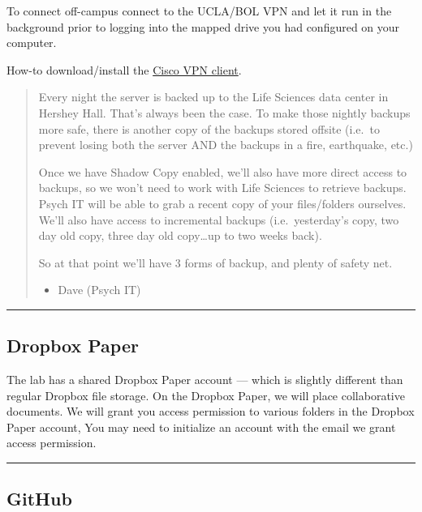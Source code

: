\documentclass[
]{book}
\providecommand{\tightlist}{%
  \setlength{\itemsep}{0pt}\setlength{\parskip}{0pt}}
\begin{document}
To connect off-campus connect to the UCLA/BOL VPN and let it run in the background prior to logging into the mapped drive you had configured on your computer.

How-to download/install the \href{https://help.bol.ucla.edu/kb_view.do?sysparm_article=kb0010923}{Cisco VPN client}.

\begin{quote}
Every night the server is backed up to the Life Sciences data center in Hershey Hall. That's always been the case. To make those nightly backups more safe, there is another copy of the backups stored offsite (i.e.~to prevent losing both the server AND the backups in a fire, earthquake, etc.)

Once we have Shadow Copy enabled, we'll also have more direct access to backups, so we won't need to work with Life Sciences to retrieve backups. Psych IT will be able to grab a recent copy of your files/folders ourselves. We'll also have access to incremental backups (i.e.~yesterday's copy, two day old copy, three day old copy\ldots up to two weeks back).

So at that point we'll have 3 forms of backup, and plenty of safety net.

\begin{itemize}
\tightlist
\item
  Dave (Psych IT)
\end{itemize}
\end{quote}

\begin{center}\rule{0.5\linewidth}{0.5pt}\end{center}

\hypertarget{dropbox-paper}{%
\subsection{Dropbox Paper}\label{dropbox-paper}}

The lab has a shared Dropbox Paper account --- which is slightly different than regular Dropbox file storage. On the Dropbox Paper, we will place collaborative documents. We will grant you access permission to various folders in the Dropbox Paper account, You may need to initialize an account with the email we grant access permission.

\begin{center}\rule{0.5\linewidth}{0.5pt}\end{center}

\hypertarget{github}{%
\subsection{GitHub}\label{github}}
\end{document}
